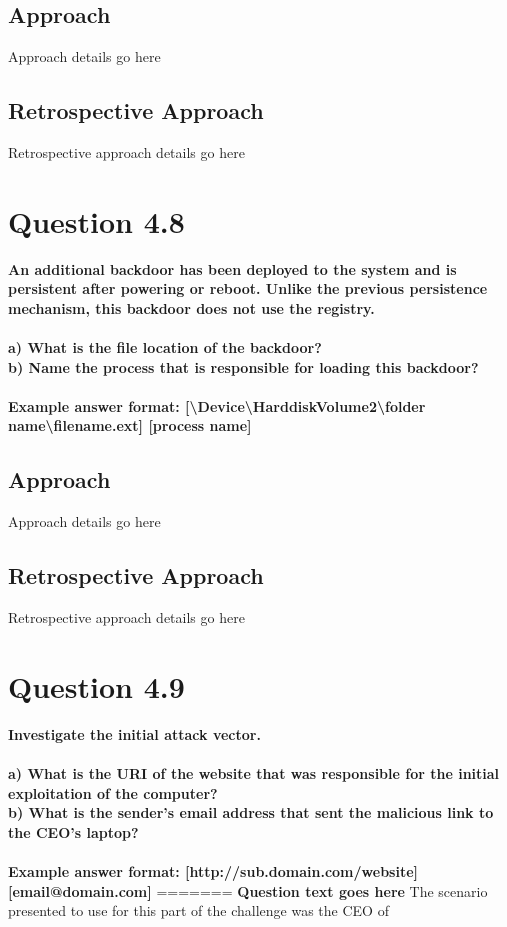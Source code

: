 \subsection{Approach}
Approach details go here
\subsection{Retrospective Approach}
Retrospective approach details go here

\section{Question 4.8}
\textbf{An additional backdoor has been deployed to the system and is persistent
after powering or reboot. Unlike the previous persistence mechanism, this
backdoor does not use the registry.
\\
\\a) What is the file location of the backdoor?
\\b) Name the process that is responsible for loading this backdoor?
\\\\
Example answer format:
[\textbackslash{}Device\textbackslash{}HarddiskVolume2\textbackslash{}folder
name\textbackslash{}filename.ext] [process name]}
\subsection{Approach}
Approach details go here
\subsection{Retrospective Approach}
Retrospective approach details go here

\section{Question 4.9}
\textbf{Investigate the initial attack vector.
\\
\\a) What is the URI of the website that was responsible for the initial
exploitation of the computer?
\\b) What is the sender's email address that sent the malicious link to the
CEO's laptop?
\\\\
Example answer format: [http://sub.domain.com/website] [email@domain.com]}
=======
\textbf{Question text goes here}
The scenario presented to use for this part of the challenge was the CEO of 
